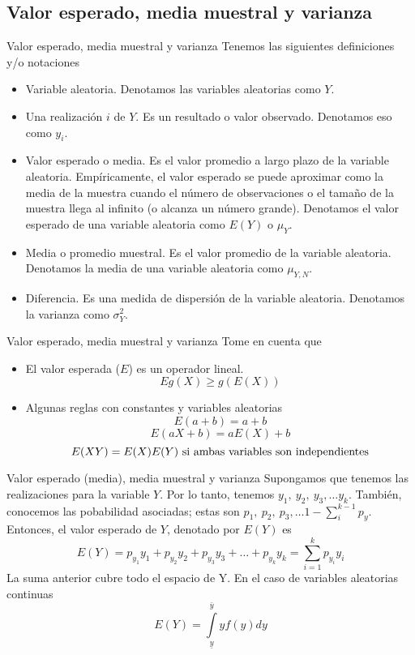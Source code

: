 \subsection{Valor esperado, media muestral y varianza}
\begin{frame}{Valor esperado, media muestral y varianza}
	Tenemos las siguientes definiciones y/o notaciones
	\begin{itemize}
		\item Variable aleatoria. Denotamos las variables aleatorias como $Y$.
		\item Una realización $i$ de $Y$. Es un resultado o valor observado. Denotamos eso como $y_{i}$.
		\item Valor esperado o media. Es el valor promedio a largo plazo de la variable aleatoria. Empíricamente, el valor esperado se puede aproximar como la media de la muestra cuando el número de observaciones o el tamaño de la muestra llega al infinito (o alcanza un número grande). Denotamos el valor esperado de una variable aleatoria como $E(Y)$ o $\mu_{Y}$.
		\item Media o promedio muestral. Es el valor promedio de la variable aleatoria. Denotamos la media de una variable aleatoria como $\mu_{Y, N}$.
		\item Diferencia. Es una medida de dispersión de la variable aleatoria. Denotamos la varianza como $\sigma_{Y}^{2}$.
	\end{itemize}
\end{frame}
\begin{frame}{Valor esperado, media muestral y varianza}
	Tome en cuenta que
	\begin{itemize}
		\item El valor esperada ($E$)  es un operador lineal.
		$$Eg(X) \geq g(E(X))$$
		\item Algunas reglas con constantes y variables aleatorias
		$$E(a+b) = a+b$$
		$$E(aX+b)=aE(X)+b$$
		$$E(XY)=E(X)E(Y) \textup{ si ambas variables son independientes}$$
	\end{itemize}
\end{frame}
\begin{frame}{Valor esperado (media), media muestral y varianza}
	Supongamos que tenemos las realizaciones para la variable $Y$. Por lo tanto,  tenemos $y_{1},\ y_{2},\ y_{3}, \ldots y_{k}$. También, conocemos las pobabilidad asociadas; estas son $p_{1},\ p_{2},\ p_{3}, \ldots 1 - \sum_{i}^{k-1}p_{y}$. Entonces, el valor esperado de $Y$, denotado por $E(Y)$ es $$E(Y) = p_{y_{1}}y_{1}+p_{y_{2}}y_{2}+p_{y_{3}}y_{3}+\ldots+p_{y_{k}}y_{k} = \sum_{i=1}^{k}p_{y_{i}}y_{i}$$ La suma anterior cubre todo el espacio de Y. En el caso de variables aleatorias continuas $$E(Y) = \int \limits_{\underline{y}}^{\bar{y}}yf(y)dy$$
\end{frame}
